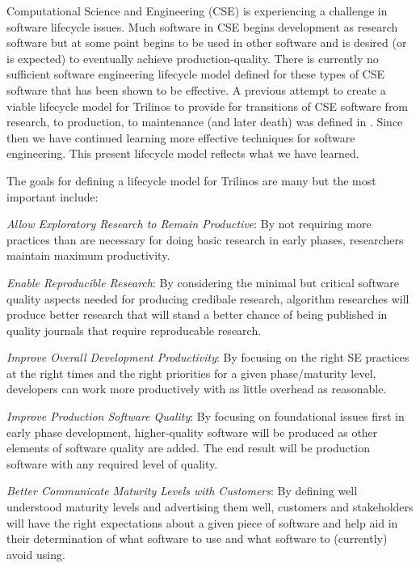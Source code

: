 \documentclass[11pt]{SANDreport}
\begin{document}
Computational Science and Engineering (CSE) is experiencing a
challenge in software lifecycle issues.  Much software in CSE begins
development as research software but at some point begins to be used
in other software and is desired (or is expected) to eventually
achieve production-quality.  There is currently no sufficient software
engineering lifecycle model defined for these types of CSE software
that has been shown to be effective.  A previous attempt to create a
viable lifecycle model for Trilinos to provide for transitions of CSE
software from research, to production, to maintenance (and later
death) was defined in {}\cite{TrilinosLifecycleModel2007}.  Since then we
have continued learning more effective techniques for software engineering.
This present lifecycle model reflects what we have learned.

The goals for defining a lifecycle model for Trilinos are many but the
most important include:

\begin{compactitem}

{}\item\textit{Allow Exploratory Research to Remain Productive}: By
not requiring more practices than are necessary for doing basic
research in early phases, researchers maintain maximum productivity.

{}\item\textit{Enable Reproducible Research}: By considering the
minimal but critical software quality aspects needed for producing
credibale research, algorithm researches will produce better research
that will stand a better chance of being published in quality journals
that require reproducable research.

{}\item\textit{Improve Overall Development Productivity}: By focusing
on the right SE practices at the right times and the right priorities
for a given phase/maturity level, developers can work more
productively with as little overhead as reasonable.

{}\item\textit{Improve Production Software Quality}: By focusing on
foundational issues first in early phase development, higher-quality
software will be produced as other elements of software quality are
added.  The end result will be production software with any required
level of quality.

{}\item\textit{Better Communicate Maturity Levels with Customers}: By
defining well understood maturity levels and advertising them well,
customers and stakeholders will have the right expectations about a
given piece of software and help aid in their determination of what
software to use and what software to (currently) avoid using.

\end{compactitem}
\end{document}
